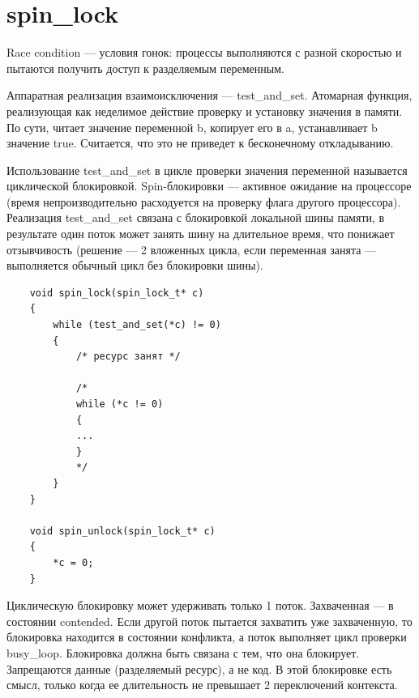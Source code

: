 
\section{spin\_lock}

Race condition --- условия гонок: процессы выполняются с разной скоростью и пытаются получить доступ к разделяемым переменным. 

Аппаратная реализация взаимоисключения --- test\_and\_set. Атомарная функция, реализующая как неделимое действие проверку и установку значения в памяти. По сути, читает значение переменной b, копирует его в a, устанавливает b значение true. Считается, что это не приведет к бесконечному откладыванию. 

Использование test\_and\_set в цикле проверки значения переменной называется циклической блокировкой. Spin-блокировки --- активное ожидание на процессоре (время непроизводительно расходуется на проверку флага другого процессора). Реализация test\_and\_set связана с блокировкой локальной шины памяти, в результате один поток может занять шину на длительное время, что понижает отзывчивость (решение --- 2 вложенных цикла, если переменная занята --- выполняется обычный цикл без блокировки шины).

\begin{lstlisting}
	void spin_lock(spin_lock_t* c)
	{
		while (test_and_set(*c) != 0)
		{
			/* ресурс занят */
			
			/*
			while (*c != 0) 
			{
			...
			}
			*/
		}
	}
	
	void spin_unlock(spin_lock_t* c)
	{
		*c = 0;
	}
\end{lstlisting}

Циклическую блокировку может удерживать только 1 поток. Захваченная --- в состоянии contended. Если другой поток пытается захватить уже захваченную, то блокировка находится в состоянии конфликта, а поток выполняет цикл проверки busy\_loop. Блокировка должна быть связана с тем, что она блокирует. Запрещаются данные (разделяемый ресурс), а не код. В этой блокировке есть смысл, только когда ее длительность не превышает 2 переключений контекста.

